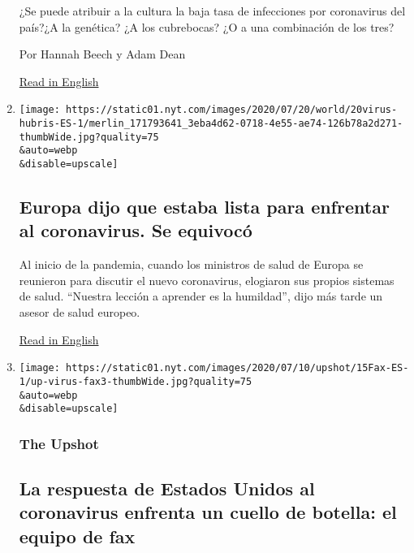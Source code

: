 \begin{enumerate}
  ¿Se puede atribuir a la cultura la baja tasa de infecciones por
  coronavirus del país?¿A la genética? ¿A los cubrebocas? ¿O a una
  combinación de los tres?

  Por Hannah Beech y Adam Dean

  \href{https://www.nytimes.com/2020/07/16/world/asia/coronavirus-thailand-photos.html}{Read
  in English}
\item
  \href{/es/2020/07/21/espanol/mundo/errores-europa-coronavirus.html}{}

  \texttt{[image: https://static01.nyt.com/images/2020/07/20/world/20virus-hubris-ES-1/merlin\_171793641\_3eba4d62-0718-4e55-ae74-126b78a2d271-thumbWide.jpg?quality=75\\\&auto=webp\\\&disable=upscale]}

  \hypertarget{europa-dijo-que-estaba-lista-para-enfrentar-al-coronavirus-se-equivocuxf3}{%
  \subsection{Europa dijo que estaba lista para enfrentar al
  coronavirus. Se
  equivocó}\label{europa-dijo-que-estaba-lista-para-enfrentar-al-coronavirus-se-equivocuxf3}}

  Al inicio de la pandemia, cuando los ministros de salud de Europa se
  reunieron para discutir el nuevo coronavirus, elogiaron sus propios
  sistemas de salud. ``Nuestra lección a aprender es la humildad'', dijo
  más tarde un asesor de salud europeo.

  \href{https://www.nytimes.com/2020/07/20/world/europe/coronavirus-mistakes-france-uk-italy.html}{Read
  in English}
\item
  \href{/es/2020/07/15/espanol/mundo/coronavirus-sistema-salud-publica.html}{}

  \texttt{[image: https://static01.nyt.com/images/2020/07/10/upshot/15Fax-ES-1/up-virus-fax3-thumbWide.jpg?quality=75\\\&auto=webp\\\&disable=upscale]}

  \hypertarget{the-upshot}{%
  \subsubsection{The Upshot}\label{the-upshot}}

  \hypertarget{la-respuesta-de-estados-unidos-al-coronavirus-enfrenta-un-cuello-de-botella-el-equipo-de-fax}{%
  \subsection{La respuesta de Estados Unidos al coronavirus enfrenta un
  cuello de botella: el equipo de
  fax}\label{la-respuesta-de-estados-unidos-al-coronavirus-enfrenta-un-cuello-de-botella-el-equipo-de-fax}}


\end{enumerate}
